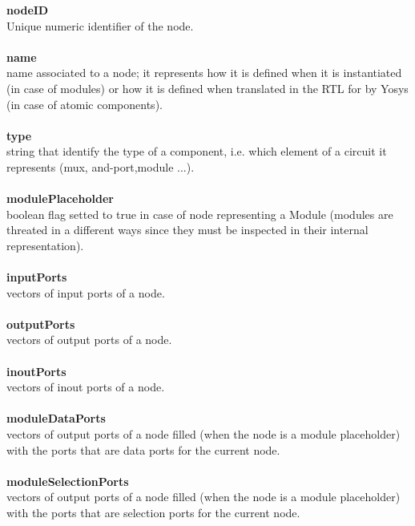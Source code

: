 \documentclass{article}
\begin{document}
\textbf{nodeID}\\
Unique numeric identifier of the node.\\\\

\textbf{name}\\
name associated to a node; it represents how it is defined when it is instantiated (in case of modules) or how it is defined when translated in the RTL for by Yosys (in case of atomic components).\\\\

\textbf{type}\\
string that identify the type of a component, i.e. which element of a circuit it represents (mux, and-port,module ...).\\\\

\textbf{modulePlaceholder}\\
boolean flag setted to true in case of node representing a Module (modules are threated in a different ways since they must be inspected in their internal representation).\\\\

\textbf{inputPorts}\\
vectors of input ports of a node.\\\\

\textbf{outputPorts}\\
vectors of output ports of a node.\\\\

\textbf{inoutPorts}\\
vectors of inout ports of a node.\\\\

\textbf{moduleDataPorts}\\
vectors of output ports of a node filled (when the node is a module placeholder) with the ports that are data ports for the current node.\\\\

\textbf{moduleSelectionPorts}\\
vectors of output ports of a node filled (when the node is a module placeholder) with the ports that are selection ports for the current node.\\\\
\end{document}
